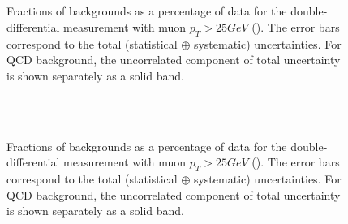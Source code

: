 \clearpage
\begin{figure}[phtb]
  \begin{center}
         \\
        \\
      \caption{ Fractions of backgrounds as a percentage of data for the double-differential measurement with muon $p_{T} > 25 GeV$ (\Wmunup). The error bars correspond to the total (statistical  $\oplus$ systematic) uncertainties. For QCD background, the uncorrelated component of total uncertainty is shown separately as a solid band.}
    \label{fig:Wmunu:BkgFractionsDoubleDiff_POS}
 \end{center}
\end{figure}

\clearpage
\begin{figure}[phtb]
  \begin{center}
         \\
        \\
    \caption{ Fractions of backgrounds as a percentage of data for the double-differential measurement with muon $p_{T} > 25 GeV$ (\Wmunum). The error bars correspond to the total (statistical  $\oplus$ systematic) uncertainties. For QCD background, the uncorrelated component of total uncertainty is shown separately as a solid band.}
    \label{fig:Wmunu:BkgFractionsDoubleDiff_NEG}
 \end{center}
\end{figure}

